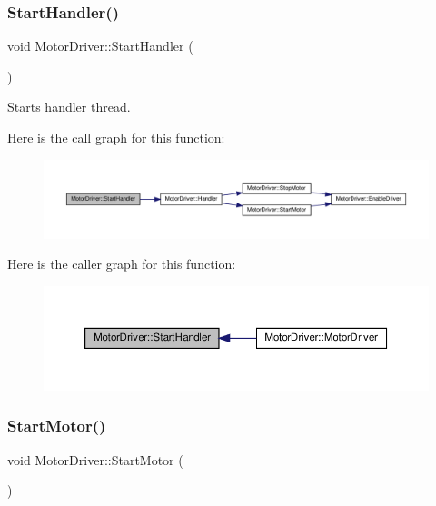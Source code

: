 \subsubsection{\texorpdfstring{Start\+Handler()}{StartHandler()}}
{\footnotesize\ttfamily void Motor\+Driver\+::\+Start\+Handler (\begin{DoxyParamCaption}{ }\end{DoxyParamCaption})\hspace{0.3cm}{\ttfamily [private]}}



Starts handler thread. 

Here is the call graph for this function\+:
\nopagebreak
\begin{figure}[H]
\begin{center}
\leavevmode
\includegraphics[width=350pt]{classMotorDriver_a64827491330490668bb8f8e57d0f3942_cgraph}
\end{center}
\end{figure}
Here is the caller graph for this function\+:
\nopagebreak
\begin{figure}[H]
\begin{center}
\leavevmode
\includegraphics[width=350pt]{classMotorDriver_a64827491330490668bb8f8e57d0f3942_icgraph}
\end{center}
\end{figure}
\mbox{\label{classMotorDriver_a5ebab90ca98fa04463de1cbae76af994}} 
\subsubsection{\texorpdfstring{Start\+Motor()}{StartMotor()}}
{\footnotesize\ttfamily void Motor\+Driver\+::\+Start\+Motor (\begin{DoxyParamCaption}{ }\end{DoxyParamCaption})\hspace{0.3cm}{\ttfamily [private]}}



